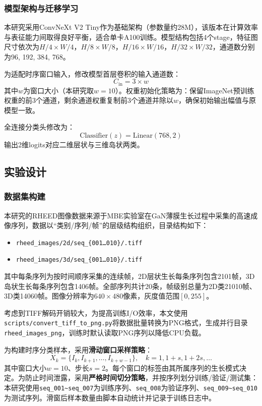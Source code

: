 \subsubsection{模型架构与迁移学习}

本研究采用ConvNeXt V2 Tiny作为基础架构（参数量约28M），该版本在计算效率与表征能力间取得良好平衡，适合单卡A100训练。模型结构包括4个stage，特征图尺寸依次为$H/4 \times W/4$，$H/8 \times W/8$，$H/16 \times W/16$，$H/32 \times W/32$，通道数分别为96, 192, 384, 768。

为适配时序窗口输入，修改模型首层卷积的输入通道数：
\begin{equation}
C_{\text{in}} = 3 \times w
\end{equation}
其中$w$为窗口大小（本研究取$w=10$）。权重初始化策略为：保留ImageNet预训练权重的前3个通道，剩余通道权重复制前3个通道并除以$w$，确保初始输出幅值与原模型一致。

全连接分类头修改为：
\begin{equation}
\text{Classifier}(z) = \text{Linear}(768, 2)
\end{equation}
输出2维logits对应二维层状与三维岛状两类。

\subsection{实验设计}

\subsubsection{数据集构建}

本研究的RHEED图像数据来源于MBE实验室在GaN薄膜生长过程中采集的高速成像序列，数据以“类别/序列/帧”的层级结构组织，目录结构如下：
\begin{itemize}
\item \texttt{rheed\_images/2d/seq\_\{001\ldots010\}/\*.tiff}
\item \texttt{rheed\_images/3d/seq\_\{001\ldots010\}/\*.tiff}
\end{itemize}
其中每条序列为按时间顺序采集的连续帧，2D层状生长每条序列包含2101帧，3D岛状生长每条序列包含1406帧。全部序列共计20条，帧级别总量为2D类21010帧、3D类14060帧。图像分辨率为$640 \times 480$像素，灰度值范围$[0, 255]$。

考虑到TIFF解码开销较大，为提高训练I/O效率，本文使用\texttt{scripts/convert\_tiff\_to\_png.py}将数据批量转换为PNG格式，生成并行目录\texttt{rheed\_images\_png}，训练时默认读取PNG序列以降低CPU负载。

为构建时序分类样本，采用\textbf{滑动窗口采样策略}：
\begin{equation}
X_k = \{I_k, I_{k+1}, \dots, I_{k+w-1}\}, \quad k = 1, 1+s, 1+2s, \dots
\end{equation}
其中窗口大小$w=10$、步长$s=2$。每个窗口的标签由其所属序列的生长模式决定。为防止时间泄露，采用\textbf{严格时间切分策略}，并按序列划分训练/验证/测试集：本研究使用\texttt{seq\_001\sim seq\_007}为训练序列、\texttt{seq\_008}为验证序列、\texttt{seq\_009\sim seq\_010}为测试序列。滑窗后样本数量由脚本自动统计并记录于训练日志中。

